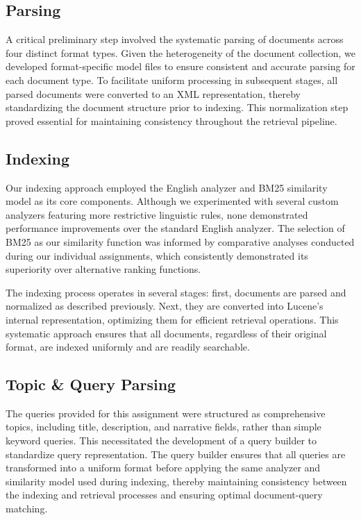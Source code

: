 \documentclass[sigplan,screen,nonacm]{acmart}
\begin{document}
\subsection{Parsing}

A critical preliminary step involved the systematic parsing of documents across four distinct format types. Given the heterogeneity of the document collection, we developed format-specific model files to ensure consistent and accurate parsing for each document type. To facilitate uniform processing in subsequent stages, all parsed documents were converted to an XML representation, thereby standardizing the document structure prior to indexing. This normalization step proved essential for maintaining consistency throughout the retrieval pipeline.

\subsection{Indexing}

Our indexing approach employed the English analyzer and BM25 similarity model as its core components. Although we experimented with several custom analyzers featuring more restrictive linguistic rules, none demonstrated performance improvements over the standard English analyzer. The selection of BM25 as our similarity function was informed by comparative analyses conducted during our individual assignments, which consistently demonstrated its superiority over alternative ranking functions.

The indexing process operates in several stages: first, documents are parsed and normalized as described previously. Next, they are converted into Lucene's internal representation, optimizing them for efficient retrieval operations. This systematic approach ensures that all documents, regardless of their original format, are indexed uniformly and are readily searchable.

\subsection{Topic \& Query Parsing}

The queries provided for this assignment were structured as comprehensive topics, including title, description, and narrative fields, rather than simple keyword queries. This necessitated the development of a query builder to standardize query representation. The query builder ensures that all queries are transformed into a uniform format before applying the same analyzer and similarity model used during indexing, thereby maintaining consistency between the indexing and retrieval processes and ensuring optimal document-query matching.
\end{document}
